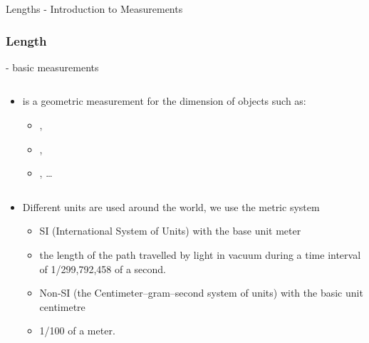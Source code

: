 \begin{omgroup}{Lengths - Introduction to Measurements}
\begin{module}[id=lenght]
\begin{frame}
  \frametitle{Length}
  - basic measurements\\
  \begin{columns}
    \begin{column}{5.8cm}
      \begin{itemize}
      \item
      \begin{definition}
         is a geometric measurement for the dimension of objects such as:
        \begin{itemize}
        \item {},
        \item {},
        \item {}, \ldots
        \end{itemize}
      \end{definition}
    \end{itemize}
    \end{column}
    \begin{column}{5.5cm}
    \end{column}
  \end{columns}
\begin{itemize}
\item Different units are used around the world, we use the metric system
  	\begin{itemize}
  	\item SI (International System of Units) with the base unit meter
  	\item 	\begin{definition}
		  		 the length of the path travelled by light in vacuum during a time interval of 1/299,792,458 of a second.
			\end{definition}
  	\item Non-SI (the Centimeter–gram–second system of units) with the basic unit centimetre
  	\item 	\begin{definition}
			   1/100 of a meter.
			\end{definition}
	\end{itemize}
\end{itemize}
\end{frame}
\end{module}
\end{omgroup}
